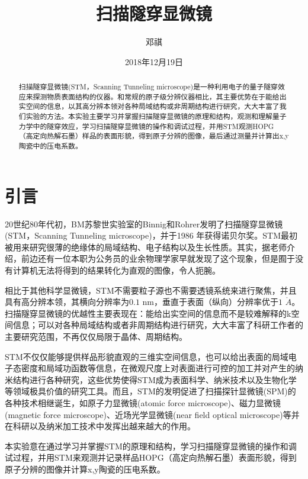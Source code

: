 \documentclass[aps,pre,12pt,preprint,onecolumn,showpacs,showkeys]{revtex4-1}
\begin{document}
\title{\bf\heiti{}扫描隧穿显微镜\vspace{15mm}}
\author{\fangsong{}邓祺\vspace{2mm}}
\date{2018年12月19日}

\begin{abstract}
\vspace{10mm}
\begin{spacing}{1.5}
\songti{}
扫描隧穿显微镜(STM，Scanning Tunneling microscope)是一种利用电子的量子隧穿效应来探测物质表面结构的仪器。和常规的原子级分辨仪器相比，其主要优势在于能给出实空间的信息，以其高分辨本领对各种局域结构或非周期结构进行研究，大大丰富了我们实验的方法。本实验主要学习并掌握扫描隧穿显微镜的原理和结构，观测和理解量子力学中的隧穿效应，学习扫描隧穿显微镜的操作和调试过程，并用STM观测HOPG （高定向热解石墨）样品的表面形貌，得到原子分辨的图像，最后通过测量并计算出x,y陶瓷中的压电系数。
\end{spacing}
\end{abstract}
\maketitle
\songti{}


\section{引言}
20世纪80年代初，BM苏黎世实验室的Binnig和Rohrer发明了扫描隧穿显微镜(STM，Scanning Tunneling microscope)，并于1986 年获得诺贝尔奖。STM最初被用来研究很薄的绝缘体的局域结构、电子结构以及生长性质。其实，据老师介绍，前边还有一位本职为公务员的业余物理学家早就发现了这个现象，但是囿于没有计算机无法将得到的结果转化为直观的图像，令人扼腕。\par
相比于其他科学显微镜，STM不需要粒子源也不需要透镜系统来进行聚焦，并且具有高分辨本领，其横向分辨率为$0.1$ nm，垂直于表面（纵向）分辨率优于$1$ $\mathring{A}$。扫描隧穿显微镜的优越性主要表现在：能给出实空间的信息而不是较难解释的k空间信息；可以对各种局域结构或者非周期结构进行研究，大大丰富了科研工作者的主要研究范围，不再仅仅局限于晶体、周期结构。\par
STM不仅仅能够提供样品形貌直观的三维实空间信息，也可以给出表面的局域电子态密度和局域功函数等信息，在微观尺度上对表面进行可控的加工并对产生的纳米结构进行各种研究，这些优势使得STM成为表面科学、纳米技术以及生物化学等领域极具价值的研究工具。而且，STM的发明促进了扫描探针显微镜(SPM)的各种技术相继诞生，如原子力显微镜(atomic force microscope)、磁力显微镜(magnetic force microscope)、近场光学显微镜(near field optical microscope)等并在科研以及纳米加工技术中发挥出越来越大的作用。\par
本实验意在通过学习并掌握STM的原理和结构，学习扫描隧穿显微镜的操作和调试过程，并用STM来观测并记录样品HOPG（高定向热解石墨）表面形貌，得到原子分辨的图像并计算x,y陶瓷的压电系数。\par
\end{document}
